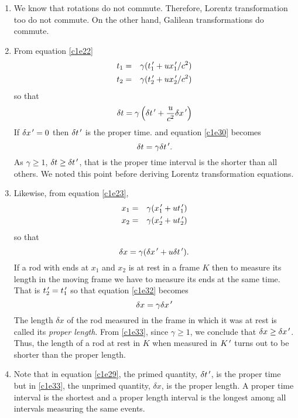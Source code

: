 \begin{enumerate}
\item We know that rotations do not commute. Therefore, Lorentz transformation
too do not commute. On the other hand, Galilean transformations do commute.

\item From equation \eqref{c1e22}
\begin{eqnarray}
t_1 &=& \gamma(t_1^{\,\prime} + ux_1^{\,\prime}/c^2) \label{c1e26} \\
t_2 &=& \gamma(t_2^{\,\prime} + ux_2^{\,\prime}/c^2) \label{c1e27} 
\end{eqnarray}
so that
\begin{equation}\label{c1e28}
\delta t = \gamma\left(\delta t^{\,\prime} + \frac{u}{c^2}\delta x^{\,\prime}\right)
\end{equation}
If $\delta x^{\,\prime} = 0$ then $\delta t^{\,\prime}$ is the proper time. and equation 
\eqref{c1e30} becomes
\begin{equation}\label{c1e29}
\delta t = \gamma\delta t^{\,\prime}.
\end{equation}
As $\gamma \ge 1$, $\delta t \ge \delta t^{\,\prime}$, that is the proper time interval
is the shorter than all others. We noted this point before deriving Lorentz
transformation equations.

\item Likewise, from equation \eqref{c1e23},
\begin{eqnarray}
x_1 &=& \gamma(x_1^{\,\prime} + ut_1^{\,\prime})\label{c1e30} \\
x_2 &=& \gamma(x_2^{\,\prime} + ut_2^{\,\prime})\label{c1e31} 
\end{eqnarray}
so that
\begin{equation}\label{c1e32}
\delta x = \gamma(\delta x^{\,\prime} + u\delta t^{\,\prime}).
\end{equation}
If a rod with ends at $x_1$ and $x_2$ is at rest in a frame $K$ then to
measure its length in the moving frame we have to measure its ends at the same
time. That is $t^{\,\prime}_2 = t^{\,\prime}_1$ so that equation \eqref{c1e32} becomes
\begin{equation}\label{c1e33}
\delta x = \gamma\delta x^{\,\prime}
\end{equation}
The length $\delta x$ of the rod measured in the frame in which it was at rest
is called its \emph{proper length}. From \eqref{c1e33}, since $\gamma \ge 1$, 
we conclude that $\delta x \ge \delta x^{\,\prime}$. Thus, the length of a rod at rest 
in $K$ when measured in $K^{\,\prime}$ turns out to be shorter than the proper length.

\item Note that in equation \eqref{c1e29}, the primed quantity, $\delta t^{\,\prime}$,
is the proper time but in \eqref{c1e33}, the unprimed quantity, $\delta x$, is 
the proper length. A proper time interval is the shortest and a proper length
interval is the longest among all intervals measuring the same events.


\end{enumerate}
